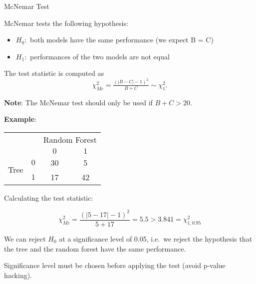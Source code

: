 \begin{frame}[c,allowframebreaks]{McNemar Test}
    \medskip

    McNemar tests the following hypothesis:
    \begin{itemize}
    \item $H_0:$ both models have the same performance (we expect B = C)
    \item $H_1:$ performances of the two models are not equal
    \end{itemize}

    The test statistic is computed as
    $$\chi^2_{Mc} =  \tfrac{(|B-C| - 1)^2}{B + C} \sim \chi^2_{1}.$$

    \textbf{Note}: The McNemar test should only be used if $B + C > 20$.

    \framebreak

    \textbf{Example}:

    \begin{center}
      \begin{tabular}{cc|cc}
          & & \multicolumn{2}{c}{Random Forest} \\
          & & $0$ & $1$ \\
          \hline
          \multirow{2}{*}{Tree} & $0$ & 30 & 5 \\
          & $1$ & 17 & 42 \\
      \end{tabular}
    \end{center}

    Calculating the test statistic:

    $$\chi^2_{Mc} =  \frac{(|5-17| - 1)^2}{5 + 17} = 5.5 > 3.841 = \chi^2_{1,0.95}$$

    We can reject $H_0$ at a significance level of 0.05, i.e.\ we reject the hypothesis that the tree and the random forest have the same performance.

    Significance level must be chosen before applying the test (avoid p-value
    hacking).
    \end{frame}


